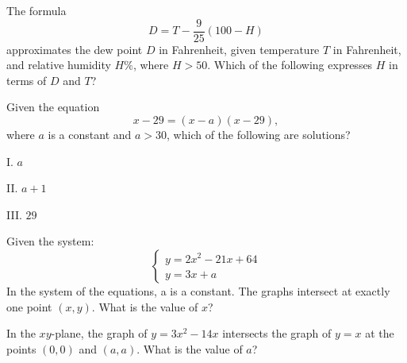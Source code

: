 \vspace{2em}

\noindent\markforreview
\vspace{1em}

The formula  
\[
D = T - \frac{9}{25}(100 - H)
\]  
approximates the dew point \(D\) in Fahrenheit, given temperature \(T\) in Fahrenheit,  
and relative humidity \(H\%\), where \(H > 50\).  
Which of the following expresses \(H\) in terms of \(D\) and \(T\)?

\vspace{0.75em}


\newpage
\noindent\markforreview
\vspace{1em}

Given the equation  
\[
x - 29 = (x - a)(x - 29),
\]  
where \(a\) is a constant and \(a > 30\),  
which of the following are solutions?

I. \(a\) 

II. \(a + 1\) 

III. \(29\)

\vspace{0.75em}



\vspace{2em}
\noindent\markforreview
\vspace{1em}

Given the system:  
\[
\begin{cases}
y = 2x^2 - 21x + 64 \\
y = 3x + a
\end{cases}
\]  
In the system of the equations, a is a constant. The graphs intersect at exactly one point \((x, y)\). What is the value of \(x\)?

\vspace{0.75em}


\newpage

\noindent\markforreview
\vspace{1em}

In the \(xy\)-plane, the graph of \(y = 3x^2 - 14x\) intersects the graph of \(y = x\)  
at the points \((0, 0)\) and \((a, a)\). What is the value of \(a\)?


